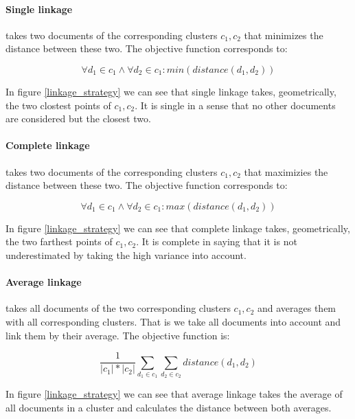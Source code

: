     \paragraph{Single linkage} takes two documents of the corresponding clusters $c_1,c_2$ that minimizes the distance between these two. The objective function corresponds to:
      
      \begin{equation}
        \forall d_1 \in c_1 \wedge \forall d_2 \in c_1: min(distance(d_1, d_2))
      \end{equation}

    In figure \ref{linkage_strategy} we can see that single linkage takes, geometrically, the two clostest points of $c_1,c_2$. It is single in a sense that no other documents are considered but the closest two.

    \paragraph{Complete linkage} takes two documents of the corresponding clusters $c_1,c_2$ that maximizies the distance between these two. The objective function corresponds to:
      
      \begin{equation}
        \forall d_1 \in c_1 \wedge \forall d_2 \in c_1: max(distance(d_1, d_2))
      \end{equation}

    In figure \ref{linkage_strategy} we can see that complete linkage takes, geometrically, the two farthest points of $c_1,c_2$. It is complete in saying that it is not underestimated by taking the high variance into account.

    \paragraph{Average linkage} takes all documents of the two corresponding clusters $c_1,c_2$ and averages them with all corresponding clusters. That is we take all documents into account and link them by their average. The objective function is:

      \begin{equation}
        \frac{1}{|c_1|*|c_2|} \sum_{d_1 \in c_1} \sum_{d_2 \in c_2} distance(d_1, d_2)
      \end{equation}

    In figure \ref{linkage_strategy} we can see that average linkage takes the average of all documents in a cluster and calculates the distance between both averages.

